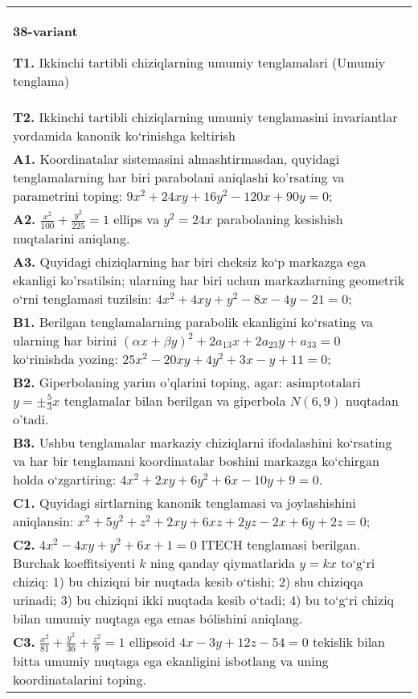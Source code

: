 \documentclass{article}
\begin{document}
\begin{tabular}{m{17cm}}
\textbf{38-variant}
\newline

\textbf{T1.} Ikkinchi tartibli chiziqlarning umumiy tenglamalari (Umumiy tenglama) \\
\textbf{T2.} Ikkinchi tartibli chiziqlarning umumiy tenglamasini invariantlar yordamida kanonik ko‘rinishga keltirish \\
\textbf{A1.} Koordinatalar sistemasini almashtirmasdan, quyidagi tenglamalarning har biri parabolani aniqlashi ko'rsating va parametrini toping: $9 x^2+24 x y+16 y^2-120 x+90 y=0$; \\
\textbf{A2.} $\frac{x^2}{100}+\frac{y^2}{225}=1$ ellips va $y^2=24 x$ parabolaning kesishish nuqtalarini aniqlang. \\
\textbf{A3.} Quyidagi chiziqlarning har biri cheksiz ko‘p markazga ega ekanligi ko'rsatilsin; ularning har biri uchun markazlarning geometrik o‘rni tenglamasi tuzilsin: $4 x^2+4 x y+y^2-8 x-4 y-21=0$; \\
\textbf{B1.} Berilgan tenglamalarning parabolik ekanligini ko‘rsating va ularning har birini $(\alpha x+\beta y)^2+2 a_{13} x+2 a_{23} y+a_{33}=0$ ko‘rinishda yozing: $25 x^2-20 x y+4 y^2+3 x-y+11=0$; \\
\textbf{B2.} Giperbolaning yarim o'qlarini toping, agar: asimptotalari $y= \pm \frac{5}{3} x$ tenglamalar bilan berilgan va giperbola $N(6,9)$ nuqtadan o'tadi. \\
\textbf{B3.} Ushbu tenglamalar markaziy chiziqlarni ifodalashini ko‘rsating va har bir tenglamani koordinatalar boshini markazga ko‘chirgan holda o‘zgartiring: $4 x^2+2 x y+6 y^2+6 x-10 y+9=0$. \\
\textbf{C1.} Quyidagi sirtlarning kanonik tenglamasi va joylashishini aniqlansin: $x^2+5 y^2+z^2+2 x y+6 x z+2 y z-2 x+6 y+2 z=0$; \\
\textbf{C2.} $4 x^2-4 x y+y^2+6 x+1=0$ ITECH tenglamasi berilgan. Burchak koeffitsiyenti $k$ ning qanday qiymatlarida $y=kx$ to‘g‘ri chiziq: 1) bu chiziqni bir nuqtada kesib o‘tishi; 2) shu chiziqqa urinadi; 3) bu chiziqni ikki nuqtada kesib o‘tadi; 4) bu to‘g‘ri chiziq bilan umumiy nuqtaga ega emas bólishini aniqlang. \\
\textbf{C3.} $\frac{x^2}{81}+\frac{y^2}{36}+\frac{z^2}{9}=1$ ellipsoid $4 x-3 y+12 z-54=0$ tekislik bilan bitta umumiy nuqtaga ega ekanligini isbotlang va uning koordinatalarini toping. \\

\end{tabular}
\vspace{1cm}
\end{document}

